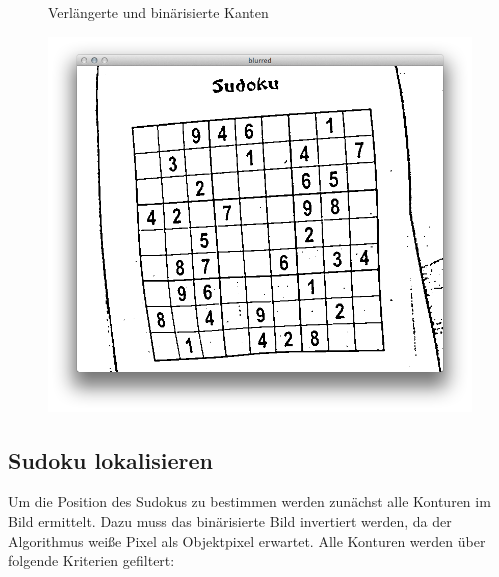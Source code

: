 \begin{figure}[h!]
    \hfill
    \caption{Verlängerte und binärisierte Kanten}
\end{figure}

\begin{figure}[h!]
    \begin{center}
        \includegraphics[width=.5\textwidth]{Abbildungen/median}
    \end{center}
\end{figure}


\subsection{Sudoku lokalisieren}
Um die Position des Sudokus zu bestimmen werden zunächst alle Konturen im Bild ermittelt. Dazu muss das binärisierte Bild invertiert werden, da der Algorithmus weiße Pixel als Objektpixel erwartet.
Alle Konturen werden über folgende Kriterien gefiltert:

